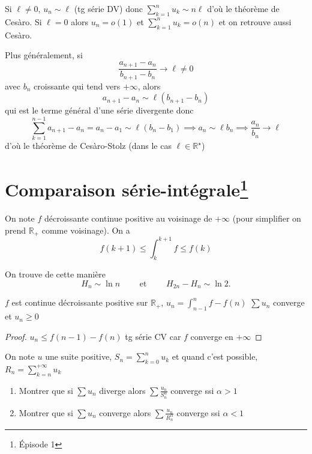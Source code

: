 \begin{rem}
    Si $\ell\neq 0$, $u_n\sim \ell$ (tg série DV) donc $\sum_{k=1}^nu_k\sim n\ell$ d'où le théorème de Cesàro. Si $\ell=0$ alors $u_n=o(1)$ et $\sum_{k=1}^nu_k=o(n)$ et on retrouve aussi Cesàro.

    Plus généralement, si \[
        \frac{a_{n+1}-a_n}{b_{n+1}-b_n}\longrightarrow\ell\neq 0
    \]
    avec $b_n$ croissante qui tend vers $+\infty$, alors \[
        a_{n+1}-a_n\sim \ell (b_{n+1}-b_n)
    \]
    qui est le terme général d'une série divergente donc \[
        \sum_{k=1}^{n-1}a_{n+1}-a_n=a_n-a_1\sim \ell (b_n-b_1) \implies a_n\sim \ell b_n\implies \frac{a_n}{b_n}\longrightarrow \ell
    \]
    d'où le théorème de Cesàro-Stolz (dans le cas $\ell\in\mathbb R^\star$)
\end{rem}

\section{Comparaison série-intégrale\texorpdfstring{\footnote{Épisode 1}}{}}

On note $f$ décroissante continue positive au voisinage de $+\infty$ (pour simplifier on prend $\mathbb R_+$ comme voisinage). On a \[
    f(k+1)\leq \int_k^{k+1}f\leq f(k)
\]

\begin{ex}
    On trouve de cette manière \[
        H_n\sim\ln n\qquad \text{ et }\qquad H_{2n}-H_n\sim \ln 2.
    \]
\end{ex}

\begin{thm}
    \Hyp $f$ est continue décroissante positive sur $\mathbb R_+$, $u_n=\displaystyle\int_{n-1}^n f-f(n)$
    \Conc $\sum u_n$ converge et $u_n\geq 0$
\end{thm}

\begin{proof}
    $u_n\leq f(n-1)-f(n)$ tg série CV car $f$ converge en $+\infty$
\end{proof}

\begin{exo}
    On note $u$ une suite positive, $S_n=\sum_{k=0}^nu_k$ et quand c'est possible, $R_n=\sum_{k=n}^{+\infty}u_k$
    \begin{enumerate}
        \item Montrer que si $\sum u_n$ diverge alors $\sum \frac{u_n}{S_n^\alpha}$ converge ssi $\alpha>1$
        \item Montrer que si $\sum u_n$ converge alors $\sum \frac{u_n}{R_n^\alpha}$ converge ssi $\alpha<1$
    \end{enumerate}
\end{exo}

